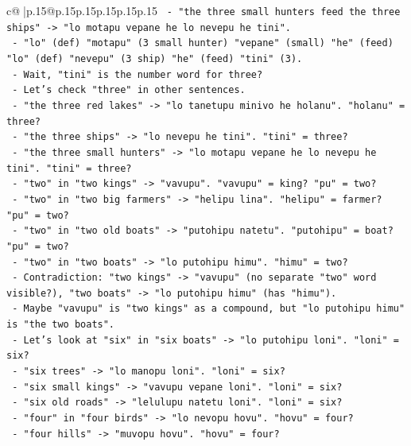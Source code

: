 \documentclass{article}
\begin{document}
{\begin{supertabular}{c@{$\;$}|p{.15\linewidth}@{}p{.15\linewidth}p{.15\linewidth}p{.15\linewidth}p{.15\linewidth}p{.15\linewidth}}
{{{\texttt{        {-} "the three small hunters feed the three ships" {-}> "lo motapu vepane he lo nevepu he tini".} \\
\texttt{          {-} "lo" (def) "motapu" (3 small hunter) "vepane" (small) "he" (feed) "lo" (def) "nevepu" (3 ship) "he" (feed) "tini" (3).} \\
\texttt{          {-} Wait, "tini" is the number word for three?} \\
\texttt{          {-} Let's check "three" in other sentences.} \\
\texttt{          {-} "the three red lakes" {-}> "lo tanetupu minivo he holanu". "holanu" = three?} \\
\texttt{          {-} "the three ships" {-}> "lo nevepu he tini". "tini" = three?} \\
\texttt{          {-} "the three small hunters" {-}> "lo motapu vepane he lo nevepu he tini". "tini" = three?} \\
\texttt{          {-} "two" in "two kings" {-}> "vavupu". "vavupu" = king? "pu" = two?} \\
\texttt{          {-} "two" in "two big farmers" {-}> "helipu lina". "helipu" = farmer? "pu" = two?} \\
\texttt{          {-} "two" in "two old boats" {-}> "putohipu natetu". "putohipu" = boat? "pu" = two?} \\
\texttt{          {-} "two" in "two boats" {-}> "lo putohipu himu". "himu" = two?} \\
\texttt{          {-} Contradiction: "two kings" {-}> "vavupu" (no separate "two" word visible?), "two boats" {-}> "lo putohipu himu" (has "himu").} \\
\texttt{          {-} Maybe "vavupu" is "two kings" as a compound, but "lo putohipu himu" is "the two boats".} \\
\texttt{          {-} Let's look at "six" in "six boats" {-}> "lo putohipu loni". "loni" = six?} \\
\texttt{          {-} "six trees" {-}> "lo manopu loni". "loni" = six?} \\
\texttt{          {-} "six small kings" {-}> "vavupu vepane loni". "loni" = six?} \\
\texttt{          {-} "six old roads" {-}> "lelulupu natetu loni". "loni" = six?} \\
\texttt{          {-} "four" in "four birds" {-}> "lo nevopu hovu". "hovu" = four?} \\
\texttt{          {-} "four hills" {-}> "muvopu hovu". "hovu" = four?} \\
}}}
\end{supertabular}}
\end{document}
